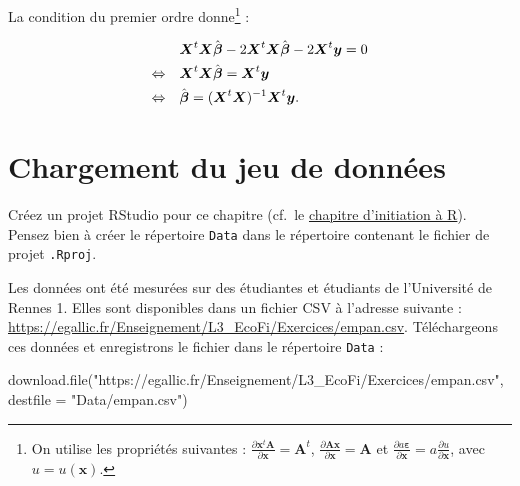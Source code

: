 \documentclass[
  11pt,
]{book}
\newenvironment{Shaded}{\begin{snugshade}}{\end{snugshade}}
\newcommand{\AttributeTok}[1]{\textcolor[rgb]{0.77,0.63,0.00}{#1}}
\newcommand{\FunctionTok}[1]{\textcolor[rgb]{0.00,0.00,0.00}{#1}}
\newcommand{\NormalTok}[1]{#1}
\newcommand{\StringTok}[1]{\textcolor[rgb]{0.31,0.60,0.02}{#1}}
\numberwithin{equation}{section}
\numberwithin{countremarque}{section}
\newenvironment{greenbox}{
  \begin{tcolorbox}[breakable, colback=vert,coltext=black,
                  colframe=grisfonce]}
 {\end{tcolorbox}}
\begin{document}
La condition du premier ordre donne\footnote{On utilise les propriétés suivantes : \(\frac{\partial \boldsymbol x^t \boldsymbol A}{\partial \boldsymbol x} = \boldsymbol A^t\), \(\frac{\partial \boldsymbol A \boldsymbol x}{\partial \boldsymbol x} = \boldsymbol A\) et \(\frac{\partial a \boldsymbol \varepsilon}{\partial \boldsymbol x} = a \frac{\partial u}{\partial \boldsymbol x}\), avec \(u = u(\boldsymbol x)\).} :

\begin{align*}
& \boldsymbol X^t \boldsymbol X\hat{\boldsymbol \beta} - 2 \boldsymbol X^t \boldsymbol X \hat{\boldsymbol \beta} - 2 \boldsymbol X^t \boldsymbol y = 0\notag\\
\Leftrightarrow \quad & \boldsymbol X^t \boldsymbol X \hat{\boldsymbol\beta} = \boldsymbol X^t \boldsymbol y\notag\\
\Leftrightarrow \quad & \hat{\boldsymbol\beta} = (\boldsymbol X^t \boldsymbol X)^{-1} \boldsymbol X^t \boldsymbol y.
\end{align*}

\hypertarget{chargement-du-jeu-de-donnuxe9es}{%
\section{Chargement du jeu de données}\label{chargement-du-jeu-de-donnuxe9es}}

\begin{greenbox}
Créez un projet RStudio pour ce chapitre (cf.~le \protect\hyperlink{initiation-uxe0-r}{chapitre d'initiation à R}). Pensez bien à créer le répertoire \texttt{Data} dans le répertoire contenant le fichier de projet \texttt{.Rproj}.

\end{greenbox}

Les données ont été mesurées sur des étudiantes et étudiants de l'Université de Rennes 1. Elles sont disponibles dans un fichier CSV à l'adresse suivante : \url{https://egallic.fr/Enseignement/L3_EcoFi/Exercices/empan.csv}. Téléchargeons ces données et enregistrons le fichier dans le répertoire \texttt{Data} :

\begin{Shaded}
\begin{Highlighting}[]
\FunctionTok{download.file}\NormalTok{(}\StringTok{"https://egallic.fr/Enseignement/L3\_EcoFi/Exercices/empan.csv"}\NormalTok{,}
              \AttributeTok{destfile =} \StringTok{"Data/empan.csv"}\NormalTok{)}
\end{Highlighting}
\end{Shaded}
\end{document}
